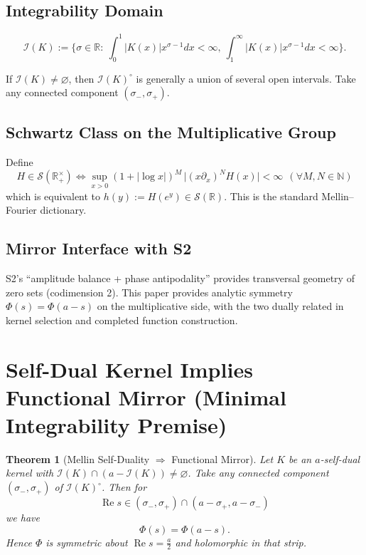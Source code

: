 \documentclass[11pt,a4paper]{article}
\newtheorem{theorem}{Theorem}[section]
\theoremstyle{remark}
\DeclareMathOperator{\Re}{Re}
\begin{document}
\subsection{Integrability Domain}

\begin{equation}
\mathcal{I}(K):=\Big\{\sigma\in\mathbb{R}:\ \int_0^1 |K(x)| x^{\sigma-1} dx<\infty,\ \int_1^\infty |K(x)| x^{\sigma-1} dx<\infty\Big\}.
\end{equation}

If $\mathcal{I}(K)\neq\varnothing$, then $\mathcal{I}(K)^\circ$ is generally a union of several open intervals. Take any connected component $(\sigma_-,\sigma_+)$.

\subsection{Schwartz Class on the Multiplicative Group}

Define
\begin{equation}
\boxed{\quad H\in\mathcal{S}(\mathbb{R}_+^\times)\iff
\sup_{x>0}(1+|\log x|)^M\,\big|(x\partial_x)^N H(x)\big|<\infty\ \ (\forall M,N\in\mathbb{N})\quad}
\end{equation}
which is equivalent to $h(y):=H(e^y)\in\mathcal{S}(\mathbb{R})$. This is the standard Mellin--Fourier dictionary.

\subsection{Mirror Interface with S2}

S2's ``amplitude balance + phase antipodality'' provides transversal geometry of zero sets (codimension 2). This paper provides analytic symmetry $\Phi(s)=\Phi(a-s)$ on the multiplicative side, with the two dually related in kernel selection and completed function construction.

\section{Self-Dual Kernel Implies Functional Mirror (Minimal Integrability Premise)}

\begin{theorem}[Mellin Self-Duality $\Rightarrow$ Functional Mirror]\label{thm:selfdual}
Let $K$ be an $a$-self-dual kernel with $\mathcal{I}(K)\cap(a-\mathcal{I}(K))\neq\varnothing$. Take any connected component $(\sigma_-,\sigma_+)$ of $\mathcal{I}(K)^\circ$. Then for
\begin{equation}
\Re s\in(\sigma_-,\sigma_+)\cap(a-\sigma_+,a-\sigma_-)
\end{equation}
we have
\begin{equation}
\Phi(s)=\Phi(a-s).
\end{equation}
Hence $\Phi$ is symmetric about $\Re s=\frac{a}{2}$ and holomorphic in that strip.
\end{theorem}
\end{document}
